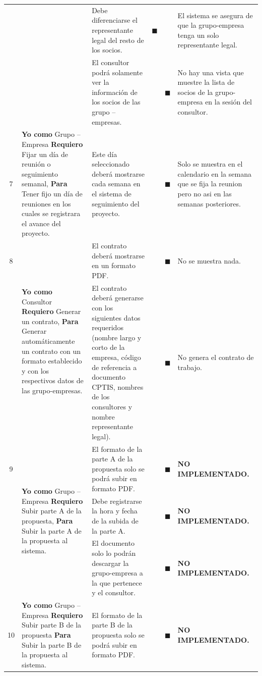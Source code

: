 \documentclass[letterpaper,11pt]{article}
\begin{document}
\begin{landscape}
\begin{tabular}{|c|p{5cm}|p{7.5cm}|c|c|p{7.5cm}|}
				& & Debe diferenciarse el representante legal del resto de los socios. & $\blacksquare$ & & El sistema se asegura de que la grupo-empresa tenga un solo representante legal.\\ \cline{3-6}
				& & El consultor podrá solamente ver la información de los socios de las grupo – empresas. & & $\blacksquare$ & No hay una vista que muestre la lista de socios de la grupo-empresa en la sesión del consultor.\\ \hline
				7 & \textbf{Yo como} Grupo – Empresa \textbf{Requiero} Fijar un día de reunión o seguimiento semanal, \textbf{Para} Tener fijo un día de reuniones en los cuales se registrara el avance del proyecto. & 	Este día seleccionado deberá mostrarse cada semana en el sistema de seguimiento del proyecto. &  & $\blacksquare$ & Solo se muestra en el calendario en la semana que se fija la reunion pero no asi en las semanas posteriores.\\ \hline
				8 & \multirow{2}{5cm}{\textbf{Yo como} Consultor \textbf{Requiero} Generar un contrato, \textbf{Para} Generar automáticamente un contrato con un formato establecido y con los respectivos datos de las grupo-empresas.} & El contrato deberá mostrarse en un formato PDF. &  & $\blacksquare$ & No se muestra nada. \\ \cline{3-6} 
				& & El contrato deberá generarse con los siguientes datos requeridos (nombre largo y corto de la empresa, código de referencia a documento CPTIS, nombres de los consultores y nombre representante legal). &   & $\blacksquare$ & No genera el contrato de trabajo.\\ \hline
				9 & \multirow{3}{5cm}{\textbf{Yo como} Grupo – Empresa \textbf{Requiero} Subir parte A de la propuesta, \textbf{Para} Subir la parte A de la propuesta al sistema.} & El formato de la parte A de la propuesta solo se podrá subir en formato PDF. & & $\blacksquare$ & \textbf{NO IMPLEMENTADO.} \\ \cline{3-6} 
				& & Debe registrarse la hora y fecha de la subida de la parte A. & & $\blacksquare$ & \textbf{NO IMPLEMENTADO.} \\ \cline{3-6} 
				& & El documento solo lo podrán descargar la grupo-empresa a la que pertenece y el consultor. & & $\blacksquare$ & \textbf{NO IMPLEMENTADO.} \\ \hline 
				10 & \multirow{3}{5cm}{\textbf{Yo como} Grupo – Empresa \textbf{Requiero} Subir parte B de la propuesta \textbf{Para} Subir la parte B de la propuesta al sistema.} & El formato de la parte B de la propuesta solo se podrá subir en formato PDF. & &  $\blacksquare$ & \textbf{NO IMPLEMENTADO.} \\ \cline{3-6} 

\end{tabular}
\end{landscape}
\end{document}
